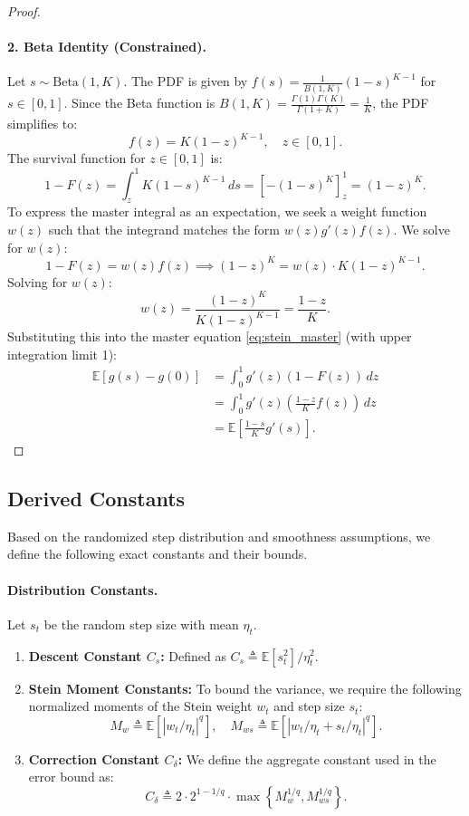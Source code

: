\documentclass{article}
\theoremstyle{plain}
\theoremstyle{definition}
\theoremstyle{remark}
\begin{document}
\begin{proof}
\paragraph{2. Beta Identity (Constrained).}
Let $s \sim \mathrm{Beta}(1, K)$. The PDF is given by $f(s) = \frac{1}{B(1, K)} (1-s)^{K-1}$ for $s \in [0, 1]$.
Since the Beta function is $B(1, K) = \frac{\Gamma(1)\Gamma(K)}{\Gamma(1+K)} = \frac{1}{K}$, the PDF simplifies to:
$$ f(z) = K (1-z)^{K-1}, \quad z \in [0, 1]. $$
The survival function for $z \in [0, 1]$ is:
$$ 1 - F(z) = \int_z^1 K (1-s)^{K-1} \, ds = \left[ -(1-s)^K \right]_z^1 = (1-z)^K. $$
To express the master integral as an expectation, we seek a weight function $w(z)$ such that the integrand matches the form $w(z) g'(z) f(z)$. We solve for $w(z)$:
$$ 1 - F(z) = w(z) f(z) \implies (1-z)^K = w(z) \cdot K (1-z)^{K-1}. $$
Solving for $w(z)$:
$$ w(z) = \frac{(1-z)^K}{K (1-z)^{K-1}} = \frac{1-z}{K}. $$
Substituting this into the master equation \eqref{eq:stein_master} (with upper integration limit 1):
\begin{align*}
    \mathbb{E}[g(s) - g(0)] &= \int_{0}^{1} g'(z) (1 - F(z)) \, dz \\
    &= \int_{0}^{1} g'(z) \left( \frac{1-z}{K} f(z) \right) \, dz \\
    &= \mathbb{E}\left[ \frac{1-s}{K} g'(s) \right].
\end{align*}
\end{proof}


\subsection{Derived Constants}
Based on the randomized step distribution and smoothness assumptions, we define the following exact constants and their bounds.

\paragraph{Distribution Constants.}
Let $s_t$ be the random step size with mean $\eta_t$.
\begin{enumerate}
    \item \textbf{Descent Constant $C_s$:} Defined as $C_s \triangleq \mathbb{E}[s_t^2] / \eta_t^2$.
    \item \textbf{Stein Moment Constants:} To bound the variance, we require the following normalized moments of the Stein weight $w_t$ and step size $s_t$:
    \begin{equation}
        M_w \triangleq \mathbb{E}[|w_t/\eta_t|^q], \quad M_{ws} \triangleq \mathbb{E}[|w_t/\eta_t + s_t/\eta_t|^q].
    \end{equation}
    \item \textbf{Correction Constant $C_\delta$:} We define the aggregate constant used in the error bound as:
    \begin{equation}
        C_\delta \triangleq 2 \cdot 2^{1-1/q} \cdot \max\left\{ M_w^{1/q}, M_{ws}^{1/q} \right\}.
    \end{equation}
\end{enumerate}
\end{document}
